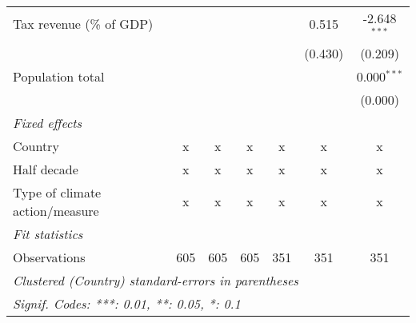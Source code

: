 \begin{tabular}{lcccccc}
   Tax revenue (\% of GDP)                                               &         &                &                &                & 0.515          & -2.648$^{***}$\\   
                                                                         &         &                &                &                & (0.430)        & (0.209)\\   
   Population total                                                      &         &                &                &                &                & 0.000$^{***}$\\   
                                                                         &         &                &                &                &                & (0.000)\\   
   \emph{Fixed effects}\\
   Country                                                               & x       & x              & x              & x              & x              & x\\  
   Half decade                                                           & x       & x              & x              & x              & x              & x\\  
   Type of climate action/measure                                        & x       & x              & x              & x              & x              & x\\  
   \midrule \emph{Fit statistics}\\
   Observations                                                          & 605     & 605            & 605            & 351            & 351            & 351\\  
   \midrule
   \multicolumn{7}{l}{\emph{Clustered (Country) standard-errors in parentheses}}\\
   \multicolumn{7}{l}{\emph{Signif. Codes: ***: 0.01, **: 0.05, *: 0.1}}\\
\end{tabular}
\par\endgroup


